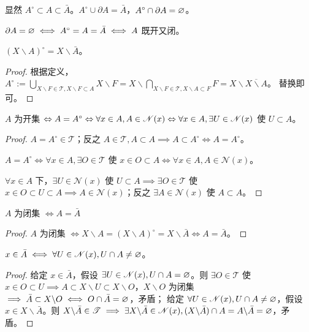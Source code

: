 \begin{remark}
    显然 $A^\circ\subset A\subset \bar A$。$A^\circ\cup\partial A=\bar A$，$A^\circ\cap\partial A=\varnothing$。
    
    $\partial A=\varnothing\iff A^\circ=A=\bar A\iff A$ 既开又闭。
\end{remark}

\begin{theorem}
    $(X\backslash A)^\circ=X\backslash \bar A$。
\end{theorem}
\begin{proof}
    根据定义，$A^\circ:=\bigcup_{X\backslash F\in\mathscr T,X\backslash F\subset A} X\backslash F=X\backslash\bigcap_{X\backslash F\in\mathscr T,X\backslash A\subset F} F=X\backslash\overline{X\backslash A}$。
    替换即可。
\end{proof}

\begin{theorem}
    $A$ 为开集 $\Leftrightarrow A=A^\circ\Leftrightarrow\forall x\in A,A\in\mathscr N(x)\Leftrightarrow\forall x\in A,\exists U\in\mathscr N(x)$ 使 $U\subset A$。
\end{theorem}

\begin{proof}
    $A=A^\circ\in\mathscr T$；反之 $A\in\mathscr T,A\subset A\implies A\subset A^\circ\iff A=A^\circ$。

    $A=A^\circ\iff\forall x\in A,\exists O\in\mathscr T$ 使 $x\in O\subset A\iff\forall x\in A, A\in\mathscr N(x)$。
    
    $\forall x\in A$ 下，$\exists U\in\mathscr N(x)$ 使 $U\subset A\implies \exists O\in\mathscr T$ 使 $ x\in O\subset U\subset A \implies A\in\mathscr N(x)$；反之 $\exists A\in\mathscr N(x)$ 使 $A\subset A$。
\end{proof}

\begin{theorem}
    $A$ 为闭集 $\iff A=\bar A$
\end{theorem}
\begin{proof}
    $A$ 为闭集 $\iff X\backslash A=(X\backslash A)^\circ=X\backslash\bar A\iff A=\bar A$。
\end{proof}

\begin{theorem}
    $x\in\bar A\iff\forall U\in\mathscr N(x),U\cap A\ne\varnothing$。
\end{theorem}
\begin{proof}
    给定 $x\in\bar A$，假设 $\exists U \in\mathscr N(x),U \cap A=\varnothing$。则 $\exists O\in\mathscr T$ 使 $x\in O\subset U\implies A\subset X \backslash U\subset X \backslash O$，$X \backslash O$ 为闭集 $\implies \bar{A} \subset X \backslash O\iff O \cap \bar{A}=\varnothing$，矛盾；
    给定 $\forall U\in\mathscr N(x),U\cap A\ne\varnothing$，假设 $x\in X \backslash \bar{A}$。则 $X \backslash \bar{A}\in\mathscr T\implies \exists X \backslash \bar{A}\in\mathscr N(x),(X \backslash \bar{A}) \cap A=A \backslash \bar{A}=\varnothing$，矛盾。
\end{proof}

